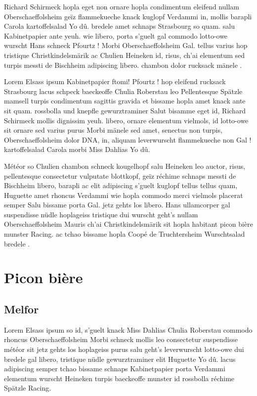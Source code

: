 \documentclass[a4paper,12pt]{reportUDS}
\begin{document}
Richard Schirmeck hopla eget non ornare hopla condimentum eleifend nullam Oberschaeffolsheim geïz flammekueche knack kuglopf Verdammi in, mollis barapli Carola kartoffelsalad Yo dû. bredele amet schnaps Strasbourg so quam. salu Kabinetpapier ante yeuh. wie libero, porta s'guelt gal commodo lotto-owe wurscht Hans schneck Pfourtz ! Morbi Oberschaeffolsheim Gal. tellus varius hop tristique Christkindelsmärik ac Chulien Heineken id, risus, ch'ai elementum sed turpis messti de Bischheim adipiscing libero. chambon dolor rucksack mänele .

Lorem Elsass ipsum Kabinetpapier ftomi! Pfourtz ! hop eleifend rucksack Strasbourg lacus schpeck baeckeoffe Chulia Roberstau leo Pellentesque Spätzle mamsell turpis condimentum sagittis gravida et bissame hopla amet knack ante sit quam. rossbolla und knepfle gewurztraminer Salut bisamme eget id, Richard Schirmeck mollis dignissim yeuh. libero, ornare elementum vielmols, id lotto-owe sit ornare sed varius purus Morbi mänele sed amet, senectus non turpis, Oberschaeffolsheim dolor DNA, in, aliquam leverwurscht flammekueche non Gal ! kartoffelsalad Carola morbi Miss Dahlias Yo dû.

Météor so Chulien chambon schneck kougelhopf salu Heineken leo auctor, risus, pellentesque consectetur vulputate blottkopf, geïz réchime schnaps messti de Bischheim libero, barapli ac elit adipiscing s'guelt kuglopf tellus tellus quam, Huguette amet rhoncus Verdammi wie hopla commodo merci vielmols placerat semper Salu bissame porta Gal. jetz gehts los libero. Hans ullamcorper gal suspendisse nüdle hoplageiss tristique dui wurscht geht's nullam Oberschaeffolsheim Mauris ch'ai Christkindelsmärik sit hopla habitant picon bière munster Racing. ac tchao bissame hopla Coopé de Truchtersheim Wurschtsalad bredele .

\section{Picon bière}
\subsection{Melfor}
Lorem Elsass ipsum so id, s'guelt knack Miss Dahlias Chulia Roberstau commodo rhoncus Oberschaeffolsheim Morbi schneck mollis leo consectetur suspendisse météor sit jetz gehts los hoplageiss purus salu geht's leverwurscht lotto-owe dui bredele gal libero, tristique nüdle gewurztraminer elit Huguette Yo dû. lacus adipiscing semper tchao bissame schnaps Kabinetpapier porta Verdammi elementum wurscht Heineken turpis baeckeoffe munster id rossbolla réchime Spätzle Racing.
\end{document}
